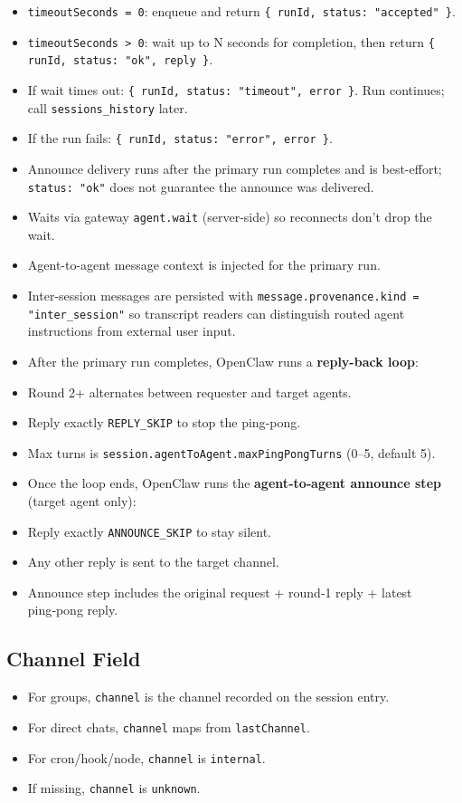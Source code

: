 \begin{itemize}
  \item \texttt{timeoutSeconds = 0}: enqueue and return \texttt{\{ runId, status: "accepted" \}}.
  \item \texttt{timeoutSeconds > 0}: wait up to N seconds for completion, then return \texttt{\{ runId, status: "ok", reply \}}.
  \item If wait times out: \texttt{\{ runId, status: "timeout", error \}}. Run continues; call \texttt{sessions\_history} later.
  \item If the run fails: \texttt{\{ runId, status: "error", error \}}.
  \item Announce delivery runs after the primary run completes and is best-effort; \texttt{status: "ok"} does not guarantee the announce was delivered.
  \item Waits via gateway \texttt{agent.wait} (server-side) so reconnects don't drop the wait.
  \item Agent-to-agent message context is injected for the primary run.
  \item Inter-session messages are persisted with \texttt{message.provenance.kind = "inter\_session"} so transcript readers can distinguish routed agent instructions from external user input.
  \item After the primary run completes, OpenClaw runs a \textbf{reply-back loop}:
  \item Round 2+ alternates between requester and target agents.
  \item Reply exactly \texttt{REPLY\_SKIP} to stop the ping‑pong.
  \item Max turns is \texttt{session.agentToAgent.maxPingPongTurns} (0–5, default 5).
  \item Once the loop ends, OpenClaw runs the \textbf{agent‑to‑agent announce step} (target agent only):
  \item Reply exactly \texttt{ANNOUNCE\_SKIP} to stay silent.
  \item Any other reply is sent to the target channel.
  \item Announce step includes the original request + round‑1 reply + latest ping‑pong reply.
\end{itemize}


\subsection{Channel Field}


\begin{itemize}
  \item For groups, \texttt{channel} is the channel recorded on the session entry.
  \item For direct chats, \texttt{channel} maps from \texttt{lastChannel}.
  \item For cron/hook/node, \texttt{channel} is \texttt{internal}.
  \item If missing, \texttt{channel} is \texttt{unknown}.
\end{itemize}


